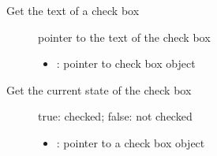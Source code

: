 \documentclass[letterpaper,10pt,english]{sphinxmanual}
\begin{document}

\begin{fulllineitems}
\label{\detokenize{object-types/cb:_CPPv414lv_cb_get_textPK8lv_obj_t}}%
\pysigstartmultiline
{}\label{\detokenize{object-types/cb:lv__cb_8h_1a2eab3547a591fba2f9beb8ef5f49bb7f}}%
\pysigstopmultiline
Get the text of a check box \begin{description}
\item[{}] \leavevmode
pointer to the text of the check box 

\item[{}] \leavevmode\begin{itemize}
\item {} 
: pointer to check box object 

\end{itemize}

\end{description}


\end{fulllineitems}


\begin{fulllineitems}
\label{\detokenize{object-types/cb:_CPPv416lv_cb_is_checkedPK8lv_obj_t}}%
\pysigstartmultiline
{}\label{\detokenize{object-types/cb:lv__cb_8h_1abbd842e07fa31287c47fcc7367848af3}}%
\pysigstopmultiline
Get the current state of the check box \begin{description}
\item[{}] \leavevmode
true: checked; false: not checked 

\item[{}] \leavevmode\begin{itemize}
\item {} 
: pointer to a check box object 

\end{itemize}

\end{description}


\end{fulllineitems}
\end{document}
